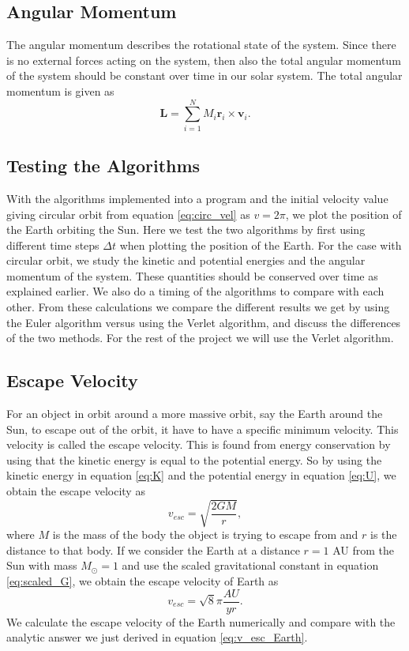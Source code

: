 \documentclass[12pt,a4paper,english]{article}
\begin{document}
\subsection{Angular Momentum}
\label{eq:Ang_mom}
The angular momentum describes the rotational state of the system. Since there is no external forces acting on the system, then also the total angular momentum of the system should be constant over time in our solar system. The total angular momentum is given as
\begin{equation}
\label{eq:ang_mom}
\textbf{L}=\sum_{i=1}^{N}M_i\textbf{r}_i\times \textbf{v}_i.
\end{equation}

\subsection{Testing the Algorithms}
\label{subsect:Testing}
With the algorithms implemented into a program and the initial velocity value giving circular orbit from equation \ref{eq:circ_vel} as $v=2\pi$, we plot the position of the Earth orbiting the Sun. Here we test the two algorithms by first using different time steps $\Delta t$ when plotting the position of the Earth. For the case with circular orbit, we study the kinetic and potential energies and the angular momentum of the system. These quantities should be conserved over time as explained earlier. We also do a timing of the algorithms to compare with each other. From these calculations we compare the different results we get by using the Euler algorithm versus using the Verlet algorithm, and discuss the differences of the two methods. For the rest of the project we will use the Verlet algorithm.

\subsection{Escape Velocity}
\label{subsect:Escape vel}
For an object in orbit around a more massive orbit, say the Earth around the Sun, to escape out of the orbit, it have to have a specific minimum velocity. This velocity is called the escape velocity. This is found from energy conservation by using that the kinetic energy is equal to the potential energy. So by using the kinetic energy in equation \ref{eq:K} and the potential energy in equation \ref{eq:U}, we obtain the escape velocity as
\begin{equation}
\label{eq:v_esc}
v_{esc}=\sqrt{\frac{2GM}{r}},
\end{equation}
where $M$ is the mass of the body the object is trying to escape from and $r$ is the distance to that body. If we consider the Earth at a distance $r=1$ AU from the Sun with mass $M_{\odot}=1$ and use the scaled gravitational constant in equation \ref{eq:scaled_G}, we obtain the escape velocity of Earth as 
\begin{equation}
\label{eq:v_esc_Earth}
v_{esc}=\sqrt{8}\pi\frac{AU}{yr}.
\end{equation}
We calculate the escape velocity of the Earth numerically and compare with the analytic answer we just derived in equation \ref{eq:v_esc_Earth}.
\end{document}
